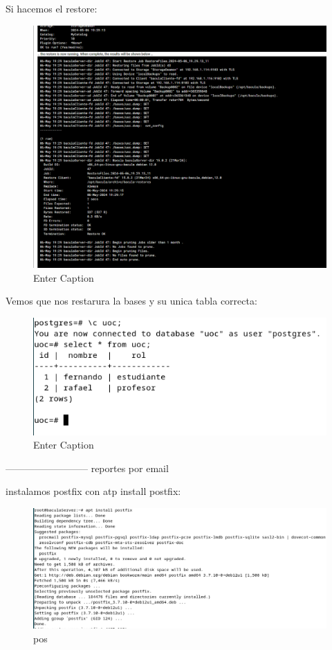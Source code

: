 Si hacemos el restore:

\begin{figure}[H]
    \centering
    \includegraphics[width=0.5\linewidth]{instalacionBacula/restoreUOCdump.png}
    \caption{Enter Caption}
\end{figure}

Vemos que nos restarura la bases y su unica tabla correcta:
\begin{figure}[H]
    \centering
    \includegraphics[width=0.5\linewidth]{instalacionBacula/restoreCompleteTABLAS.png}
    \caption{Enter Caption}
\end{figure}


--------------------------
reportes por email

instalamos postfix con atp install postfix:

\begin{figure}
    \centering
    \includegraphics[width=0.5\linewidth]{instalacionBacula/atpInstallPostfix.png}
    \caption{pos}
\end{figure}